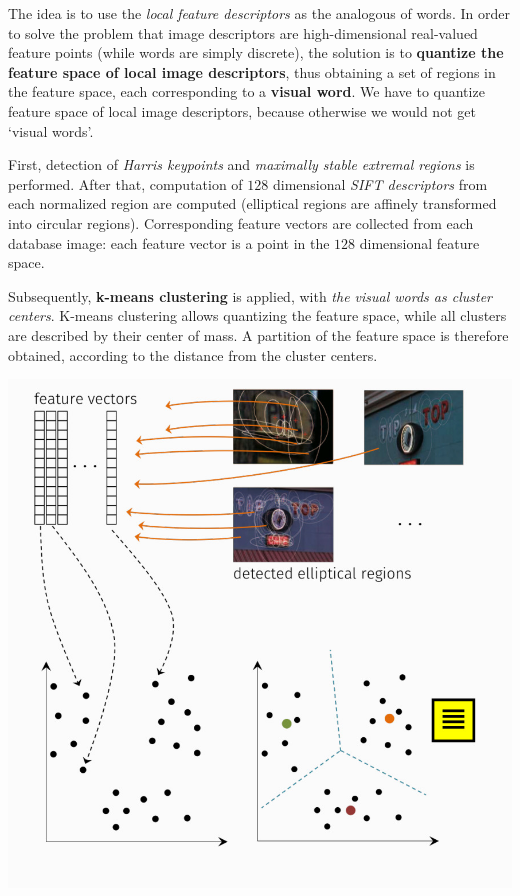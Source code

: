 \documentclass[10pt]{report}
\begin{document}
The idea is to use the \emph{local feature descriptors} as the analogous of words. In order to solve the problem that image descriptors are high\--dimensional real\--valued feature points (while words are simply discrete), the solution is to \textbf{quantize the feature space of local image descriptors}, thus obtaining a set of regions in the feature space, each corresponding to a \textbf{visual word}. We have to quantize feature space of local image descriptors, because otherwise we would not get `visual words'.

First, detection of \emph{Harris keypoints} and \emph{maximally stable extremal regions} is performed. After that, computation of \(128\) dimensional \emph{SIFT descriptors} from each normalized region are computed (elliptical regions are affinely transformed into circular regions). Corresponding feature vectors are collected from each database image: each feature vector is a point in the \(128\) dimensional feature space.

Subsequently, \textbf{k\--means clustering} is applied, with \emph{the visual words as cluster centers}. K\--means clustering allows quantizing the feature space, while all clusters are described by their center of mass. A partition of the feature space is therefore obtained, according to the distance from the cluster centers.

\begin{center}
\includegraphics[width=.9\linewidth]{./pics/recog/visual-vocabulary-construction.jpg}
\end{center}
\end{document}
